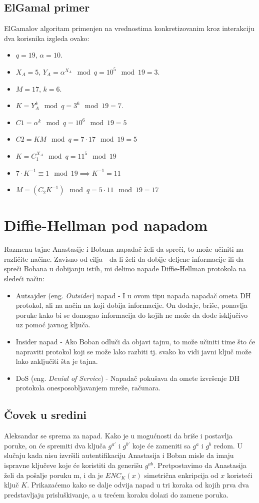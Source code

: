 \documentclass[a4paper]{article}
\begin{document}
\subsection{ElGamal primer}
ElGamalov algoritam primenjen na vrednostima konkretizovanim kroz interakciju dva korisnika izgleda ovako:
\begin{itemize}
  \item $q=19$, $\alpha=10$. 
  \item $X_A=5$, $Y_A=\alpha^{X_A}\mod q=10^5\mod 19=3$.
  \item $M=17$, $k=6$.
  \item $K=Y_A^k\mod q=3^6\mod 19=7$.
  \item $C1=\alpha^k \mod q=10^6\mod 19=5$
  \item $C2=KM\mod q=7\cdot17\mod 19=5$
  \item $K=C_1^{X_A}\mod q=11^5\mod 19$
  \item $7\cdot K^{-1} \equiv 1 \mod 19 \implies K^{-1}=11$
  \item $M=(C_2K^{-1})\mod q=5\cdot 11 \mod 19=17$
\end{itemize}

\section{Diffie-Hellman pod napadom}
Razmenu tajne Anastasije i Bobana napadač želi da spreči, to može učiniti na različite načine. Zavisno od cilja - da li želi da dobije deljene informacije ili da spreči Bobana u dobijanju istih, mi delimo napade Diffie-Hellman protokola na sledeći način:
\begin{itemize}
\item Autsajder (eng. \emph{Outsider}) napad - I u ovom tipu napada napadač ometa DH protokol, ali na način na koji dobija informacije. On dodaje, briše, ponavlja poruke kako bi se domogao informacija do kojih ne može da dođe isključivo uz pomoć javnog ključa.
\item Insider napad - Ako Boban odluči da objavi tajnu, to može učiniti time što će napraviti protokol koji se može lako razbiti tj. svako ko vidi javni ključ može lako zaključiti šta je tajna.
\item DoS (eng. \emph{Denial of Service}) - Napadač pokušava da omete izvršenje DH protokola onesposobljavanjem mreže, računara. \cite{dhpaper}
\end{itemize}


\subsection{Čovek u sredini}
Aleksandar se sprema za napad. Kako je u mogućnosti da briše i postavlja poruke, on će spremiti dva ključa $g^{a'}$ i $g^{b'}$ koje će zameniti sa $g^{a}$ i $g^{b}$ redom. U slučaju kada nisu izvršili autentifikaciju Anastasija i Boban misle da imaju ispravne ključeve koje će koristiti da generišu $g^{ab}$. Pretpostavimo da Anastasija želi da pošalje poruku m, i da je $ENC_{K}(x)$ simetrična enkripcija od $x$ koristeći ključ $K$. Prikazaćemo kako se dalje odvija napad u tri koraka od kojih prva dva predstavljaju prisluškivanje, a u trećem koraku dolazi do zamene poruka.
\end{document}
